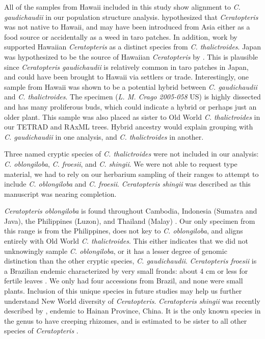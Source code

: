 \documentclass[12pt]{article}
\begin{document}
\begin{flushleft}
All of the samples from Hawaii included in this study show alignment to \textit{C. gaudichaudii} in our population structure analysis. \textcite{Wagner1950} hypothesized that \textit{Ceratopteris} was not native to Hawaii, and may have been introduced from Asia either as a food source or accidentally as a weed in taro patches. In addition, work by \textcite{Hickok1979} supported Hawaiian \textit{Ceratopteris} as a distinct species from \textit{C. thalictroides}. Japan was hypothesized to be the source of Hawaiian \textit{Ceratopteris} by \textcite{Lloyd1973}. This is plausible since \textit{Ceratopteris gaudichaudii} is relatively common in taro patches in Japan, and could have been brought to Hawaii via settlers or trade. Interestingly, one sample from Hawaii was shown to be a potential hybrid between \textit{C. gaudichaudii} and \textit{C. thalictroides}. The specimen (\textit{L. M. Crago 2005-058} US) is highly dissected and has many proliferous buds, which could indicate a hybrid or perhaps just an older plant. This sample was also placed as sister to Old World \textit{C. thalictroides} in our TETRAD and RAxML trees. Hybrid ancestry would explain grouping with \textit{C. gaudichaudii} in one analysis, and \textit{C. thalictroides} in another.

Three named cryptic species of \textit{C. thalictroides} were not included in our analysis: \textit{C. oblongiloba}, \textit{C. froesii}, and \textit{C. shingii}. We were not able to request type material, we had to rely on our herbarium sampling of their ranges to attempt to include \textit{C. oblongiloba} and \textit{C. froesii}. \textit{Ceratopteris shingii} was described as this manuscript was nearing completion. 

\textit{Ceratopteris oblongiloba} is found throughout Cambodia, Indonesia (Sumatra and Java), the Philippines (Luzon), and Thailand (Malay) \autocite{Masuyama2010}. Our only specimen from this range is from the Philippines, does not key to \textit{C. oblongiloba}, and aligns entirely with Old World \textit{C. thalictroides}. This either indicates that we did not unknowingly sample \textit{C. oblongiloba}, or it has a lesser degree of genomic distinction than the other cryptic species, \textit{C. gaudichaudii}. \textit{Ceratopteris froesii} is a Brazilian endemic characterized by very small fronds: about 4 cm or less for fertile leaves \autocite{Masuyama2010}. We only had four accessions from Brazil, and none were small plants. Inclusion of this unique species in future studies may help us further understand New World diversity of \textit{Ceratopteris}. \textit{Ceratopteris shingii} was recently described by \textcite{Zhang2020}, endemic to Hainan Province, China. It is the only known species in the genus to have creeping rhizomes, and is estimated to be sister to all other species of \textit{Ceratopteris} \autocite{Zhang2020}. 


\end{flushleft}
\end{document}
